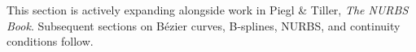 \vspace{1em}
\begin{tcolorbox}[
  colback=gray!6, colframe=gray!40, arc=2pt,
  left=8pt, right=8pt, top=6pt, bottom=6pt,
  title={\small\textbf{Status: Active}},
  fonttitle=\small\bfseries
]
\noindent This section is actively expanding alongside work in Piegl \& Tiller,
\textit{The NURBS Book}.
Subsequent sections on Bézier curves, B-splines, NURBS, and continuity
conditions follow.
\end{tcolorbox}
